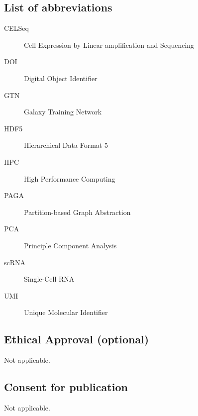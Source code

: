 \documentclass[a4paper,num-refs]{oup-contemporary}
\begin{document}
\subsection{List of abbreviations}


\begin{description}
\item[CELSeq]{Cell Expression by Linear amplification and Sequencing}
\item[DOI]{Digital Object Identifier}
\item[GTN]{Galaxy Training Network}
\item[HDF5]{Hierarchical Data Format 5}
\item[HPC]{High Performance Computing}
\item[PAGA]{Partition-based Graph Abstraction}
\item[PCA]{Principle Component Analysis}
\item[scRNA]{Single-Cell RNA}
\item[UMI]{Unique Molecular Identifier}
\end{description}



\subsection{Ethical Approval (optional)}
Not applicable.

\subsection{Consent for publication}

Not applicable.

\end{document}
